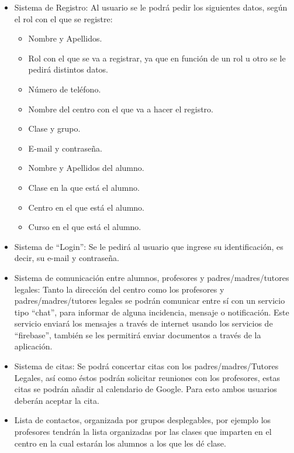 \begin{itemize}
	\item Sistema de Registro: Al usuario se le podr\'a pedir los siguientes datos, seg\'un el rol con el que se registre:
		\begin{itemize}
			\item Nombre y Apellidos.
			\item Rol con el que se va a registrar, ya que en funci\'on de un rol u otro se le pedir\'a distintos datos.
			\item N\'umero de tel\'efono.
			\item Nombre del centro con el que va a hacer el registro.
			\item Clase y grupo.
			\item E-mail y contrase\~na.
			\item Nombre y Apellidos del alumno.
			\item Clase en la que est\'a el alumno. %
			\item Centro en el que est\'a el alumno.
			\item Curso en el que est\'a el alumno.
		\end{itemize}
	\item Sistema de ``Login'': Se le pedir\'a al usuario que ingrese su identificaci\'on, es decir, su e-mail y contrase\~na.
	\item Sistema de comunicaci\'on entre alumnos, profesores y padres/madres/tutores legales: Tanto la direcci\'on del centro como los profesores y padres/madres/tutores legales se podr\'an comunicar entre s\'i con un servicio tipo ``chat'', para informar de alguna incidencia, mensaje o notificaci\'on. Este servicio enviar\'a los mensajes a trav\'es de internet usando los servicios de ``firebase'', tambi\'en se les permitir\'a enviar documentos a trav\'es de la aplicaci\'on.
	\item Sistema de citas: Se podr\'a concertar citas con los padres/madres/Tutores Legales, as\'i como \'estos podr\'an solicitar reuniones con los profesores, estas citas se podr\'an a\~nadir al calendario de Google. Para esto ambos usuarios deber\'an aceptar la cita.
	\item Lista de contactos, organizada por grupos desplegables, por ejemplo los profesores tendr\'an la lista organizadas por las clases que imparten en el centro en la cual estar\'an los alumnos a los que les d\'e clase.
\end{itemize}

